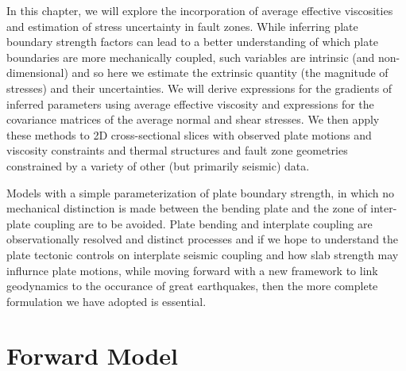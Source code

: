 \documentclass[12pt]{article}
\begin{document}
In this chapter, we will explore the incorporation of average effective viscosities and estimation of stress uncertainty in fault zones. While inferring plate boundary strength factors \citep{ratnaswamy2015adjoint} can lead to a better understanding of which plate boundaries are more mechanically coupled,  such variables are intrinsic (and non-dimensional) and so here we estimate the extrinsic quantity (the magnitude of  stresses) and their uncertainties. We will derive expressions for the gradients of inferred parameters using average effective viscosity and expressions for the covariance matrices of the average normal and shear stresses. We then apply these methods to 2D cross-sectional slices with observed plate motions and viscosity constraints and thermal structures and fault zone geometries constrained by a variety of other (but primarily seismic) data.

Models with a simple parameterization of plate boundary strength, 
in which no mechanical distinction is made between the bending plate and the
zone of inter-plate coupling are to be avoided.
Plate bending and interplate coupling are observationally
resolved and distinct processes and if we hope to understand the
plate tectonic controls on interplate seismic coupling
and how slab strength may influrnce plate motions, while moving forward
with a new framework to link geodynamics to the occurance of great
earthquakes, then the more complete
formulation we have adopted is essential.
 
\section{Forward Model}
\end{document}
